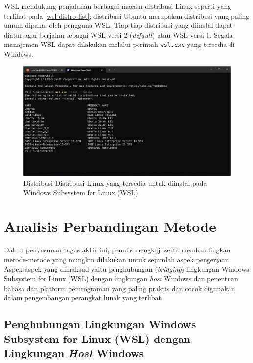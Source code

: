 
WSL mendukung penjalanan berbagai macam distribusi Linux seperti yang terlihat pada \autoref{wsl-distro-list}; distribusi Ubuntu merupakan distribusi yang paling umum dipakai oleh pengguna WSL. Tiap-tiap distribusi yang diinstal dapat diatur agar berjalan sebagai WSL versi 2 (\textit{default}) atau WSL versi 1. Segala manajemen WSL dapat dilakukan melalui perintah \verb|wsl.exe| yang tersedia di Windows.

\begin{figure}
    \centering
    \includegraphics[width=1\linewidth]{assets/Screenshot 2024-01-02 233751.png}
    \caption{Distribusi-Distribusi Linux yang tersedia untuk diinstal pada Windows Subsystem for Linux (WSL)}
    \label{wsl-distro-list}
\end{figure}

\section{Analisis Perbandingan Metode}

Dalam penyusunan tugas akhir ini, penulis mengkaji serta membandingkan metode-metode yang mungkin dilakukan untuk sejumlah aspek pengerjaan. Aspek-aspek yang dimaksud yaitu penghubungan (\textit{bridging}) lingkungan Windows Subsystem for Linux (WSL) dengan lingkungan \textit{host} Windows dan penentuan bahasa dan platform pemrograman yang paling praktis dan cocok digunakan dalam pengembangan perangkat lunak yang terlibat.

\subsection{Penghubungan Lingkungan Windows Subsystem for Linux (WSL) dengan Lingkungan \textit{Host} Windows}

